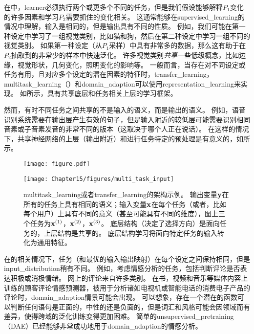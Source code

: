 在中，\gls{learner}必须执行两个或更多个不同的任务，但是我们假设能够解释$P_1$变化的许多因素和学习$P_2$需要抓住的变化相关。
这通常能够在\gls{supervised_learning}的情况中理解，输入是相同的，但是输出具有不同的性质。
例如，我们可能在第一种设定中学习了一组视觉类别，比如猫和狗，然后在第二种设定中学习一组不同的视觉类别。
如果第一种设定（从$P_1$采样）中具有非常多的数据，那么这有助于在$P_2$抽取到的非常少的样本中快速泛化。
许多视觉类别\emph{共享}一些低级概念，比如边缘，视觉形状，几何变化，照明变化的影响等。
一般而言，当存在对不同设定或任务有用，且对应多个设定的潜在因素的特征时，\gls{transfer_learning}，\gls{multitask_learning}（）和\gls{domain_adaption}可以使用\gls{representation_learning}来实现。
如所示，具有共享底层和任务相关上层的学习框架。


然而，有时不同任务之间共享的不是输入的语义，而是输出的语义。
例如，语音识别系统需要在输出层产生有效的句子，但是输入附近的较低层可能需要识别相同音素或子音素发音的非常不同的版本（这取决于哪个人正在说话）。
在这样的情况下，共享神经网络的上层（输出附近）和进行任务特定的预处理是有意义的，如所示。

\begin{figure}[!htb]
\ifOpenSource
\centerline{\texttt{[image: figure.pdf]}}
\else
\centerline{\texttt{[image: Chapter15/figures/multi\_task\_input]}}
\fi
\caption{\gls{multitask_learning}或者\gls{transfer_learning}的架构示例。
输出变量$\mathbf{y}$在所有的任务上具有相同的语义；输入变量$\mathbf{x}$在每个任务（或者，比如每个用户）上具有不同的意义（甚至可能具有不同的维度），图上三个任务为$\mathbf{x}^{(1)}$，$\mathbf{x}^{(2)}$，$\mathbf{x}^{(3)}$。
底层结构（决定了选择方向）是面向任务的，上层结构是共享的。
底层结构学习将面向特定任务的输入转化为通用特征。
}
\label{fig:chap15_multi_task_input}
\end{figure}

在的相关情况下，任务（和最优的输入输出映射）在每个设定之间保持相同，但是\gls{input_distribution}稍有不同。 
例如，考虑情感分析的任务，包括判断评论是否表达积极或消极情绪。 
网上的评论来自许多类别。
在书，视频和音乐等媒体内容上训练的顾客评论情感预测器，被用于分析诸如电视机或智能电话的消费电子产品的评论时，\gls{domain_adaption}情景可能会出现。
可以想象，存在一个潜在的函数可以判断任何语句是正面的，中性的还是负面的，但是词汇和风格可能会因领域而有差异，使得跨域的泛化训练变得更加困难。
简单的\gls{unsupervised_pretraining}（\gls{DAE}）已经能够非常成功地用于\gls{domain_adaption}的情感分析\citep{Glorot+al-ICML-2011}。

